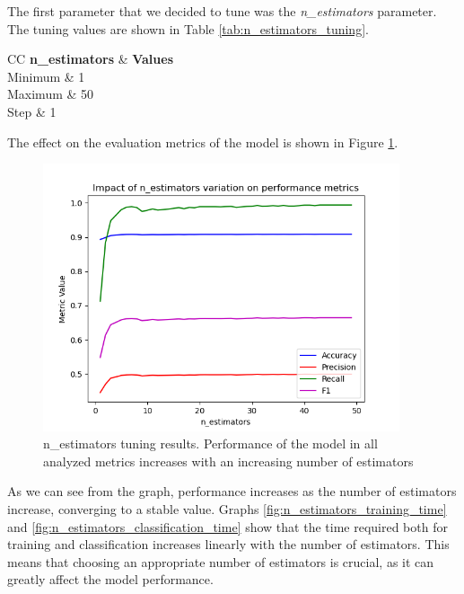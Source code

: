 \documentclass[futureinternet,article,submit,pdftex,moreauthors]{Definitions/mdpi}
\begin{document}
The first parameter that we decided to tune was the \textit{n\_estimators} parameter. The tuning values are shown in Table \ref{tab:n_estimators_tuning}.

\begin{table}[H]
	\caption{n\_estimators tuning values.}\label{tab:n_estimators_tuning}
	\begin{tabularx}{\textwidth}{CC}
	\toprule
	\textbf{n\_estimators} & \textbf{Values} \\
	\midrule
	Minimum & 1 \\
	Maximum & 50 \\
	Step & 1 \\
	\bottomrule
\end{tabularx}
\end{table}

The effect on the evaluation metrics of the model is shown in Figure \ref{fig:n_estimators_tuning}.

\begin{figure}[H]
	\centering
	\includegraphics[width=10.5cm]{img/nEstimatorsTuning.png}
	\caption{n\_estimators tuning results. Performance of the model in all analyzed metrics increases with an increasing number of estimators}\label{fig:n_estimators_tuning}
\end{figure}
\unskip

As we can see from the graph, performance increases as the number of estimators increase, converging to a stable value. 
Graphs \ref{fig:n_estimators_training_time} and \ref{fig:n_estimators_classification_time} show that the time required both for training and classification increases linearly with the number of estimators.
This means that choosing an appropriate number of estimators is crucial, as it can greatly affect the model performance. 
\end{document}
